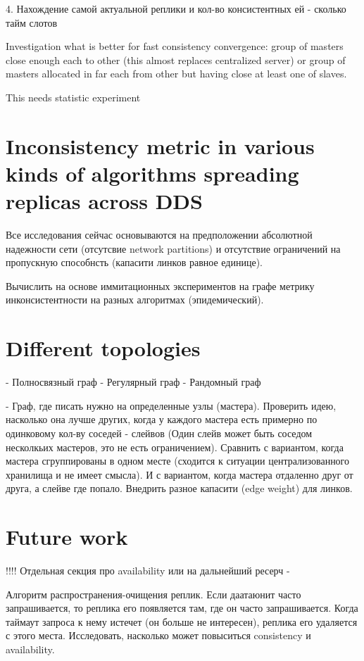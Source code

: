 \documentclass{llncs}
\begin{document}
4. Нахождение самой актуальной реплики и кол-во консистентных ей - сколько тайм слотов

Investigation what is better for fast consistency convergence:
group of masters close enough each to other (this almost replaces centralized server)
or group of masters allocated in far each from other but having close at least one of slaves.

This needs statistic experiment

\section{Inconsistency metric in various kinds of algorithms spreading replicas across DDS}
Все исследования сейчас основываются на предположении абсолютной надежности сети (отсутсвие network partitions) и отсутствие ограничений на пропускную способнсть (капасити линков равное единице).

Вычислить на основе иммитационных экспериментов на графе метрику инконсистентности на разных алгоритмах (эпидемический).

\section{Different topologies}
- Полносвязный граф
- Регулярный граф
- Рандомный граф

- Граф, где писать нужно на определенные узлы (мастера). Проверить идею, насколько она лучше других, когда у каждого мастера есть примерно по одинковому кол-ву соседей - слейвов (Один слейв может быть соседом несколкьих мастеров, это не есть ограничением). Сравнить с вариантом, когда мастера сгруппированы в одном месте (сходится к ситуации централизованного хранилища и не имеет смысла). И с вариантом, когда мастера отдаленно друг от друга, а слейве где попало.
Внедрить разное капасити (edge weight) для линков.

\section{Future work}
!!!! Отдельная секция про availability или на дальнейший ресерч -

Алгоритм распространения-очищения реплик. Если даатаюнит часто запрашивается, то реплика его появляется там, где он часто запрашивается. Когда таймаут запроса к нему истечет (он больше не интересен), реплика его удаляется с этого места.
Исследовать, насколько может повыситься consistency и availability. 
\end{document}
